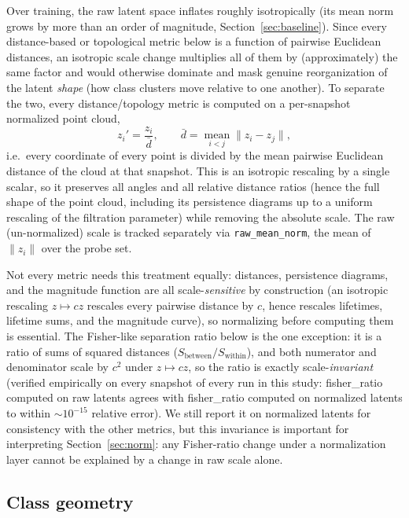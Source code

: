 \documentclass[11pt]{article}
\begin{document}
Over training, the raw latent space inflates roughly isotropically (its mean
norm grows by more than an order of magnitude, Section~\ref{sec:baseline}).
Since every distance-based or topological metric below is a function of
pairwise Euclidean distances, an isotropic scale change multiplies all of
them by (approximately) the same factor and would otherwise dominate and
mask genuine reorganization of the latent \emph{shape} (how class clusters
move relative to one another). To separate the two, every
distance/topology metric is computed on a per-snapshot normalized point
cloud,
\[
  z_i' = \frac{z_i}{\bar{d}}, \qquad
  \bar d = \operatorname*{mean}_{i<j} \lVert z_i - z_j \rVert ,
\]
i.e.\ every coordinate of every point is divided by the mean pairwise
Euclidean distance of the cloud at that snapshot. This is an isotropic
rescaling by a single scalar, so it preserves all angles and all relative
distance ratios (hence the full shape of the point cloud, including its
persistence diagrams up to a uniform rescaling of the filtration parameter)
while removing the absolute scale. The raw (un-normalized) scale is tracked
separately via \texttt{raw\_mean\_norm}, the mean of $\lVert z_i \rVert$ over
the probe set.

Not every metric needs this treatment equally: distances, persistence
diagrams, and the magnitude function are all scale-\emph{sensitive} by
construction (an isotropic rescaling $z \mapsto cz$ rescales every pairwise
distance by $c$, hence rescales lifetimes, lifetime sums, and the magnitude
curve), so normalizing before computing them is essential. The Fisher-like
separation ratio below is the one exception: it is a ratio of sums of
squared distances ($S_{\text{between}}/S_{\text{within}}$), and both
numerator and denominator scale by $c^2$ under $z \mapsto cz$, so the ratio
is exactly scale-\emph{invariant} (verified empirically on every snapshot of
every run in this study: fisher\_ratio computed on raw latents agrees with
fisher\_ratio computed on normalized latents to within $\sim 10^{-15}$
relative error). We still report it on normalized latents for consistency
with the other metrics, but this invariance is important for interpreting
Section~\ref{sec:norm}: any Fisher-ratio change under a normalization layer
cannot be explained by a change in raw scale alone.

\subsection{Class geometry}
\end{document}
